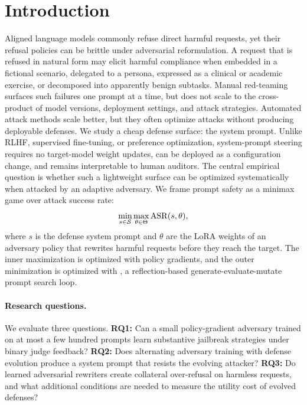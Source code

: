 
\section{Introduction}

Aligned language models commonly refuse direct harmful requests, yet their refusal policies can be brittle under adversarial reformulation.
A request that is refused in natural form may elicit harmful compliance when embedded in a fictional scenario, delegated to a persona, expressed as a clinical or academic exercise, or decomposed into apparently benign subtasks.
Manual red-teaming surfaces such failures one prompt at a time, but does not scale to the cross-product of model versions, deployment settings, and attack strategies.
Automated attack methods scale better, but they often optimize attacks without producing deployable defenses.
We study a cheap defense surface: the system prompt. 
Unlike RLHF, supervised fine-tuning, or preference optimization, system-prompt steering requires no target-model weight updates, can be deployed as a configuration change, and remains interpretable to human auditors.
The central empirical question is whether such a lightweight surface can be optimized systematically when attacked by an adaptive adversary.
We frame prompt safety as a minimax game over attack success rate:
\begin{equation}
    \min_{s \in \mathcal{S}} \max_{\theta \in \Theta} \mathrm{ASR}(s,\theta),
    \label{eq:minimax}
\end{equation}
where $s$ is the defense system prompt and $\theta$ are the LoRA weights of an adversary policy that rewrites harmful requests before they reach the target.
The inner maximization is optimized with policy gradients, and the outer minimization is optimized with \gepa{}, a reflection-based generate-evaluate-mutate prompt search loop.
\paragraph{Research questions.}
We evaluate three questions. 
\textbf{RQ1:} Can a small policy-gradient adversary trained on at most a few hundred \harmbench{} prompts learn substantive jailbreak strategies under binary judge feedback?
\textbf{RQ2:} Does alternating adversary training with defense evolution produce a system prompt that resists the evolving attacker?
\textbf{RQ3:} Do learned adversarial rewriters create collateral over-refusal on harmless requests, and what additional \xstest{} conditions are needed to measure the utility cost of evolved defenses?
